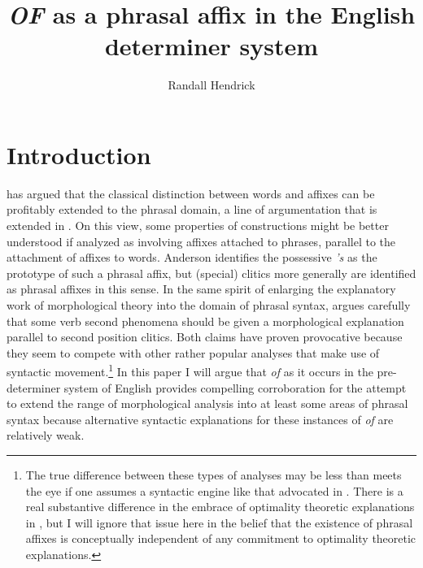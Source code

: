 \documentclass[output=paper,
modfonts
]{LSP/langsci}
\title{{\textit{OF}} as a phrasal affix in the English determiner system}
\author{Randall Hendrick\affiliation{University of North Carolina at Chapel Hill}}
\begin{document}
\maketitle


\section{Introduction}

{\citet{Anderson92}} has argued that the classical distinction between words and affixes can be profitably extended to the phrasal domain, a line of argumentation that is extended in {\citet{Anderson05}}.  On this view, some properties of constructions might be better understood if analyzed as involving affixes attached to phrases, parallel to the attachment of affixes to words.   Anderson identifies the possessive {\textit{'s}} as the prototype of such a phrasal affix, but  (special) clitics more generally are identified as phrasal affixes in this sense.  In the same spirit of enlarging the explanatory work of morphological theory into the domain of phrasal syntax, {\citet{Anderson05}} argues carefully that some verb second phenomena should be given a morphological explanation parallel to second position clitics.  Both claims have proven provocative because they seem to compete with other rather popular analyses that make use of syntactic movement.{\footnote{The true difference between these types of analyses may be less than meets the eye if one assumes a syntactic engine like that advocated in {\citet{Chomsky95}}.  There is a real substantive difference in the embrace of optimality theoretic explanations in {\citet{Anderson05}}, but I will ignore that issue here in the belief that the existence of phrasal affixes is conceptually independent of any commitment to optimality theoretic explanations.}}  In this paper I will argue that {\textit{of}} as it occurs in the pre-determiner system of English provides compelling corroboration for the attempt to extend the range of morphological analysis into at least some areas of phrasal syntax because alternative syntactic explanations for these instances of {\textit{of}} are relatively weak.
\end{document}
